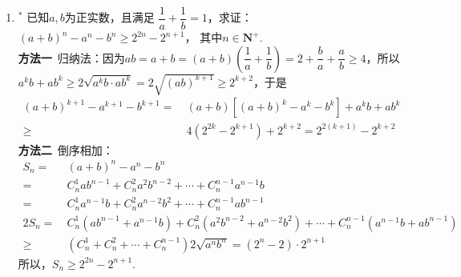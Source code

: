 \begin{enumerate}[label={【\textbf{例\thechapter.\arabic*}】},
 leftmargin=\inteval{\myenumleftmargin}pt,
 itemsep=\inteval{\myenumitempsep}pt,
 itemindent=\inteval{\myenumitemindent}pt]
\item $ ^* $ 已知$ a,b $为正实数，且满足
$ \dfrac{1}{a}+\dfrac{1}{b}=1 $，求证：
$ (a+b)^n-a^n-b^n\geq 2^{2n}-2^{n+1} $，
其中$ n \in \textbf{N}^+ $. \\
\textbf{方法一}\ 归纳法：因为$ ab=a+b=(a+b)\left(\dfrac{1}{a}+
\dfrac{1}{b}\right)=2+\dfrac{b}{a}+\dfrac{a}{b}\geq 4 $，所以
$ a^kb+ab^k\geq 2\sqrt{a^kb\cdot ab^k} = 2\sqrt{(ab)^{k+1}}
\geq 2^{k+2} $，于是
\begin{align*}
    (a+b)^{k+1}-a^{k+1}-b^{k+1}
    =&\  (a+b)[(a+b)^k-a^k-b^k]+ a^kb+ab^k \\ 
    \geq &\ 4(2^{2k}-2^{k+1})+2^{k+2}=2^{2(k+1)}-2^{k+2}
\end{align*}
\textbf{方法二}\ 倒序相加：
\begin{align*}
    S_n =&\ (a+b)^n-a^n-b^n \\
    =&\ C_n^1ab^{n-1}+C_n^2a^2b^{n-2}+\cdots +C_n^{n-1}a^{n-1}b \\
    =&\ C_n^1a^{n-1}b+C_n^2a^{n-2}b^2+\cdots +C_n^{n-1}ab^{n-1} \\  
    2S_n=&\ C_n^1(ab^{n-1}+a^{n-1}b)+C_n^2(a^2b^{n-2}+a^{n-2}b^2)+\cdots 
    +C_n^{n-1}(a^{n-1}b+ab^{n-1}) \\ 
    \geq &\ (C_n^1+C_n^2+\cdots +C_n^{n-1}) 2\sqrt{a^nb^n}=(2^n-2)\cdot 2^{n+1}
\end{align*}
所以，$ S_n \geq 2^{2n}-2^{n+1} $. 

\end{enumerate}

